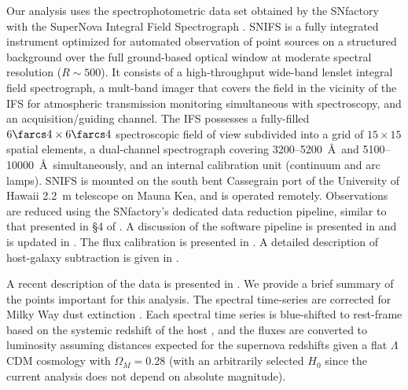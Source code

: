 \documentclass{aastex61}   	%
\begin{document}
Our analysis uses the spectrophotometric data set obtained by
the SNfactory with the SuperNova Integral Field
Spectrograph \citep[SNIFS,][]{2002SPIE.4836...61A, 2004SPIE.5249..146L}.  SNIFS is a fully integrated
instrument optimized for automated observation of point sources on a
structured background over the full ground-based optical window at
moderate spectral resolution ($R \sim 500$).  It consists of a
high-throughput wide-band lenslet integral field spectrograph, a mult-band
imager that covers the field in the vicinity of
the IFS for atmospheric transmission monitoring simultaneous with
spectroscopy, and an acquisition/guiding channel.  The IFS possesses a
fully-filled $6\farcs 4 \times 6\farcs 4$ spectroscopic field of view
subdivided into a grid of $15 \times 15$ spatial elements, a
dual-channel spectrograph covering 3200--5200~\AA\ and 5100--10000~\AA\
simultaneously, and an internal calibration unit (continuum and arc
lamps).  SNIFS is mounted on the south bent Cassegrain port of the
University of Hawaii 2.2~m telescope on Mauna Kea, and is operated
remotely.  Observations are reduced using the SNfactory's dedicated data
reduction pipeline, similar to that presented in \S4 of \citet{2001MNRAS.326...23B}.
A discussion of the software pipeline is presented in
\citet{2006ApJ...650..510A} and is updated in \citet{2010ApJ...713.1073S}. 
The flux calibration is presented in \citet{2013A&A...549A...8B}.
A detailed
description of host-galaxy subtraction is given in \citet{2011MNRAS.418..258B}.

A recent description of the data is presented in \citet{2015ApJ...815...58F}.
We provide a brief summary of the points important for this analysis.
The spectral time-series  are corrected for Milky Way dust
extinction \citep{1989ApJ...345..245C,1998ApJ...500..525S}.  
Each spectral time series is
blue-shifted to rest-frame
based on the systemic redshift of the host \citep[c.f.][]{2013ApJ...770..107C}, and the fluxes are converted to luminosity assuming
distances expected for the supernova redshifts given a flat
$\Lambda$CDM cosmology with $\Omega_M = 0.28$ (with an arbitrarily selected
$H_0$ since the current analysis does not depend on absolute magnitude).
\end{document}
